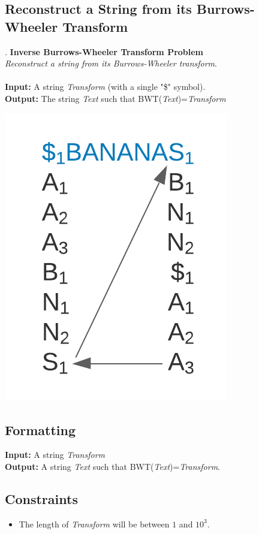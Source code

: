 \documentclass{article}
\begin{document}
\subsection{Reconstruct a String from its Burrows-Wheeler Transform}.
\hline\vspace{5}
\noindent\textbf{Inverse Burrows-Wheeler Transform Problem}\\
\emph{Reconstruct a string from its Burrows-Wheeler transform}.\\ \\
\textbf{Input:} A string \emph{Transform} (with a single "\$" symbol). \\
\textbf{Output:} The string \emph{Text} such that BWT(\emph{Text})=\emph{Transform}
\begin{center}
    \includegraphics[scale=0.2]{c9/logos/9J.png} 
\end{center}
\hline\vspace{5}

\subsection*{Formatting}
\noindent\textbf{Input:} A string \emph{Transform}\\
\noindent\textbf{Output:} A string \emph{Text} such that BWT(\emph{Text})=\emph{Transform}.

\subsection*{Constraints}
\begin{itemize}
    \item The length of \emph{Transform} will be between $1$ and $10^3$.
\end{itemize}
\pagebreak
\end{document}
